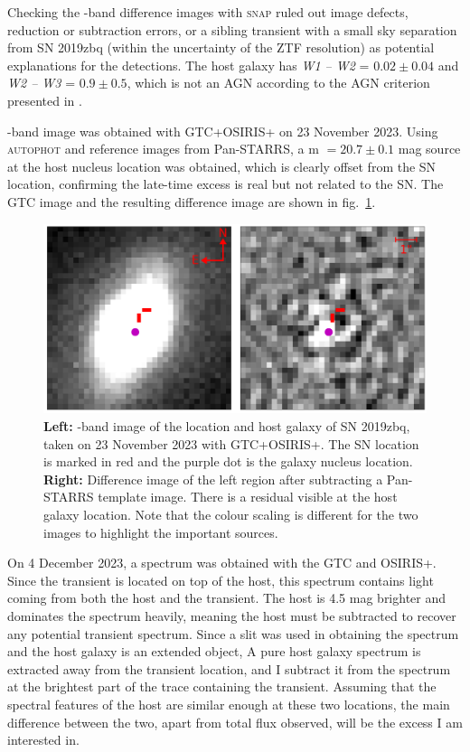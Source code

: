 \documentclass[a4paper,oneside,12pt, class=Latex/Classes/PhDthesisPSnPDF, crop=false]{standalone}
\begin{document}
Checking the \ztfr-band difference images with \textsc{snap} ruled out image defects, reduction or subtraction errors, or a sibling transient with a small sky separation from SN 2019zbq (within the uncertainty of the ZTF resolution) as potential explanations for the detections. The host galaxy has \textit{W1 -- W2} = $0.02\pm 0.04$ and  \textit{W2 -- W3} = $0.9\pm 0.5$, which is not an AGN according to the AGN criterion presented in \citet{WISE_crit}.

\ztfr-band image was obtained with GTC+OSIRIS+ on 23 November 2023. Using \textsc{autophot} and reference images from Pan-STARRS, a m $=20.7\pm0.1$ mag source at the host nucleus location was obtained, which is clearly offset from the SN location, confirming the late-time excess is real but not related to the SN. The GTC image and the resulting difference image are shown in fig.~\ref{2019zbq_difim}.

\begin{figure}
    \centering
    \includegraphics[width=\textwidth]{../Images/chapter_5/2020zbq_difim.png}
    \caption{\textbf{Left:} \ztfr-band image of the location and host galaxy of SN 2019zbq, taken on 23 November 2023 with GTC+OSIRIS+. The SN location is marked in red and the purple dot is the galaxy nucleus location. \textbf{Right:} Difference image of the left region after subtracting a Pan-STARRS template image. There is a residual visible at the host galaxy location. Note that the colour scaling is different for the two images to highlight the important sources.}
    \label{2019zbq_difim}
\end{figure}

On 4 December 2023, a spectrum was obtained with the GTC and OSIRIS+. Since the transient is located on top of the host, this spectrum contains light coming from both the host and the transient. The host is 4.5 mag brighter and dominates the spectrum heavily, meaning the host must be subtracted to recover any potential transient spectrum. Since a slit was used in obtaining the spectrum and the host galaxy is an extended object, A pure host galaxy spectrum is extracted away from the transient location, and I subtract it from the spectrum at the brightest part of the trace containing the transient. Assuming that the spectral features of the host are similar enough at these two locations, the main difference between the two, apart from total flux observed, will be the excess I am interested in.
\end{document}
